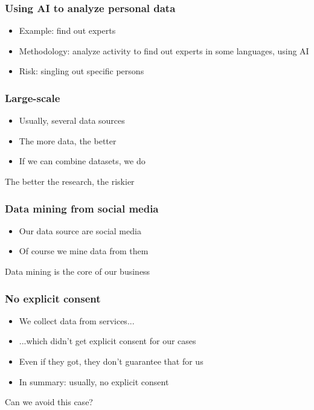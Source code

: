 \documentclass[17pt,aspectratio=169,hyperref={pdfusetitle,colorlinks,allcolors=olive}]{beamer}
\begin{document}
\begin{frame}[fragile]
  \frametitle{Using AI to analyze personal data}

  \begin{itemize}
  \item Example: find out experts

  \item Methodology: analyze activity to find out experts in some languages, using AI

  \item Risk: singling out specific persons
  \end{itemize}
  
\end{frame}

\begin{frame}[fragile]
  \frametitle{Large-scale}

  \begin{itemize}
  \item Usually, several data sources
  \item The more data, the better
  \item If we can combine datasets, we do
  \end{itemize}

  \begin{flushright}
    The better the research, the riskier
  \end{flushright}
\end{frame}

\begin{frame}[fragile]
  \frametitle{Data mining from social media}

  \begin{itemize}
  \item Our data source are social media
  \item Of course we mine data from them
  \end{itemize}

  \begin{flushright}
    Data mining is the core of our business
  \end{flushright}
\end{frame}

\begin{frame}[fragile]
  \frametitle{No explicit consent}

  \begin{itemize}
  \item We collect data from services...
  \item ...which didn't get explicit consent for our cases
  \item Even if they got, they don't guarantee that for us
  \item In summary: usually, no explicit consent
  \end{itemize}

  \begin{flushright}
    Can we avoid this case?
  \end{flushright}
\end{frame}
\end{document}
